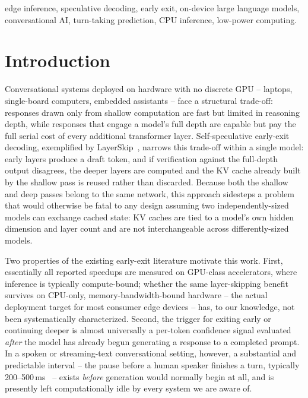 \documentclass[journal]{IEEEtran}
\begin{document}
\begin{IEEEkeywords}
edge inference, speculative decoding, early exit, on-device large language models, conversational AI, turn-taking prediction, CPU inference, low-power computing.
\end{IEEEkeywords}

\IEEEpeerreviewmaketitle

\section{Introduction}

Conversational systems deployed on hardware with no discrete GPU -- laptops, single-board computers, embedded assistants -- face a structural trade-off: responses drawn only from shallow computation are fast but limited in reasoning depth, while responses that engage a model's full depth are capable but pay the full serial cost of every additional transformer layer. Self-speculative early-exit decoding, exemplified by LayerSkip~\cite{elhoushi2024layerskip}, narrows this trade-off within a single model: early layers produce a draft token, and if verification against the full-depth output disagrees, the deeper layers are computed and the KV cache already built by the shallow pass is reused rather than discarded. Because both the shallow and deep passes belong to the same network, this approach sidesteps a problem that would otherwise be fatal to any design assuming two independently-sized models can exchange cached state: KV caches are tied to a model's own hidden dimension and layer count and are not interchangeable across differently-sized models.

Two properties of the existing early-exit literature motivate this work. First, essentially all reported speedups are measured on GPU-class accelerators, where inference is typically compute-bound; whether the same layer-skipping benefit survives on CPU-only, memory-bandwidth-bound hardware -- the actual deployment target for most consumer edge devices -- has, to our knowledge, not been systematically characterized. Second, the trigger for exiting early or continuing deeper is almost universally a per-token confidence signal evaluated \emph{after} the model has already begun generating a response to a completed prompt. In a spoken or streaming-text conversational setting, however, a substantial and predictable interval -- the pause before a human speaker finishes a turn, typically 200--500\,ms~\cite{stivers2009universals,heldner2010pauses} -- exists \emph{before} generation would normally begin at all, and is presently left computationally idle by every system we are aware of.
\end{document}
